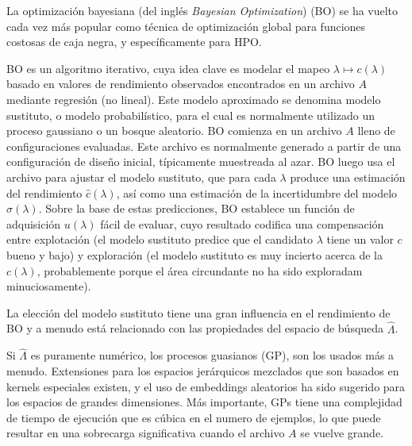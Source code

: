 La optimización bayesiana (del inglés \textit{Bayesian Optimization}) (BO) se ha vuelto cada vez más popular como técnica de optimización global para funciones costosas de caja negra, y específicamente para HPO.  

BO es un algoritmo iterativo, cuya idea clave es modelar el mapeo $\lambda \longmapsto    c(\lambda)$ basado en
valores de rendimiento observados encontrados en un archivo $A$ mediante regresión (no lineal). Este modelo aproximado se denomina modelo sustituto, o modelo probabilístico, para el cual es normalmente utilizado un proceso gaussiano o un bosque aleatorio. BO comienza en un archivo $A$ lleno de configuraciones evaluadas. Este archivo es normalmente generado a partir de una configuración de diseño inicial, típicamente muestreada al azar. BO luego usa el archivo para ajustar el modelo sustituto, que para cada $\lambda$ produce una estimación del rendimiento $\hat{c}(\lambda)$, así como una estimación de la incertidumbre del modelo $\hat{\sigma}(\lambda)$. Sobre la base de estas predicciones, BO establece un función de adquisición $u(\lambda)$ fácil de evaluar, cuyo resultado codifica una compensación entre explotación (el modelo sustituto predice que el candidato $\lambda$ tiene un valor $c$ bueno y bajo) y exploración (el modelo sustituto es muy incierto acerca de la $c(\lambda)$, probablemente porque el área circundante no ha sido exploradam minuciosamente).

La elección del modelo sustituto tiene una gran influencia en el rendimiento de BO y a menudo está relacionado con las propiedades del espacio de búsqueda $\hat{\varLambda}$. 

Si $\hat{\varLambda}$ es puramente numérico, los procesos guasianos (GP), son los usados más a menudo. Extensiones para los espacios jerárquicos mezclados que son basados en kernels especiales existen, y el uso de embeddings aleatorios ha sido sugerido para los espacios de grandes dimensiones. Más importante, GPs tiene una complejidad de tiempo de ejecución que es cúbica en el numero de ejemplos, lo que puede resultar en una sobrecarga significativa cuando el archivo $A$ se vuelve grande.

